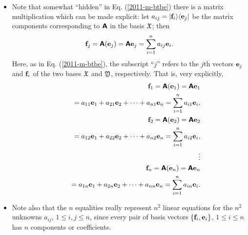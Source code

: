 \begin{itemize}
\item
Note that somewhat ``hidden'' in Eq. (\ref{2011-m-btbe})
there is a matrix multiplication which can be made explicit:
let $a_{ij}=  \vert {\bf f}_i \rangle \langle {\bf e}_j \vert $
be the matrix components corresponding to $\textsf{\textbf{A}}$
in the basis ${\frak X}$;
then
\begin{equation}
{\bf f}_j=  \textsf{\textbf{A}}({\bf e}_j ) = \textsf{\textbf{A}}{\bf e}_j  =  \sum_{i=1}^n a_{ij}{\bf e}_i.
\end{equation}
Here, as
in Eq. (\ref{2011-m-btbe}),
the subscript ``$j$'' refers to the $j$th vectors  ${\bf e}_j$ and ${\bf f}_i$ of the two bases  ${\frak X}$ and
${\frak Y}$, respectively.
That is, very explicitly,
\begin{equation}
\begin{split}
{\bf f}_1=
\textsf{\textbf{A}}({\bf e}_1 ) =
\textsf{\textbf{A}}{\bf e}_1
\\
\qquad
=
a_{11} {\bf e}_1 +a_{21} {\bf e}_2+\cdots +a_{n1} {\bf e}_n    = \sum_{i=1}^n a_{i1}{\bf e}_i,\\
{\bf f}_2=
\textsf{\textbf{A}}({\bf e}_2 )
=
\textsf{\textbf{A}}{\bf e}_2
\\
\qquad
=
a_{12} {\bf e}_1 +a_{22} {\bf e}_2+\cdots +a_{n2} {\bf e}_n    = \sum_{i=1}^n a_{i2}{\bf e}_i,\\
 \vdots \\
{\bf f}_n=
\textsf{\textbf{A}}({\bf e}_n ) =
\textsf{\textbf{A}}{\bf e}_n  \\
\qquad
= a_{1n} {\bf e}_1 +a_{2n} {\bf e}_2+\cdots +a_{nn} {\bf e}_n    = \sum_{i=1}^n a_{in}{\bf e}_i.
\end{split}
\label{2011-m-btbe-eigen}
\end{equation}

\item
Note also that the $n$ equalities really represent $n^2$ linear equations for the $n^2$
unknowns $a_{ij}$, $1\le i,j\le n$, since every pair of basis vectors
$\{{\bf f}_i,{\bf e}_i\}$, $1\le i\le n$ has $n$ components or coefficients.


\end{itemize}
